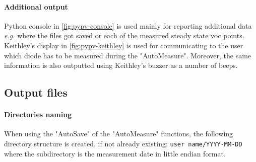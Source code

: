  \begin{figure}
 \end{figure}
 
\paragraph{Additional output}
Python console in \cref{fig:pypv-console} is used mainly for reporting additional data \textsl{e.g.} where the files got saved or each of the measured steady state \gls{voc} points.
Keithley's display in \cref{fig:pypv-keithley} is used for communicating to the user which diode has to be measured during the "AutoMeasure".
Moreover, the same information is also outputted using Keithley's buzzer as a number of beeps.

\subsection{Output files}
	
\paragraph{Directories naming}\label{pypv_naming_directories}
When using the "AutoSave" of the "AutoMeasure" functions, the following directory structure is created, if not already existing: \texttt{user name\-/YYYY-MM-DD} where the subdirectory is the measurement date in little endian format.

